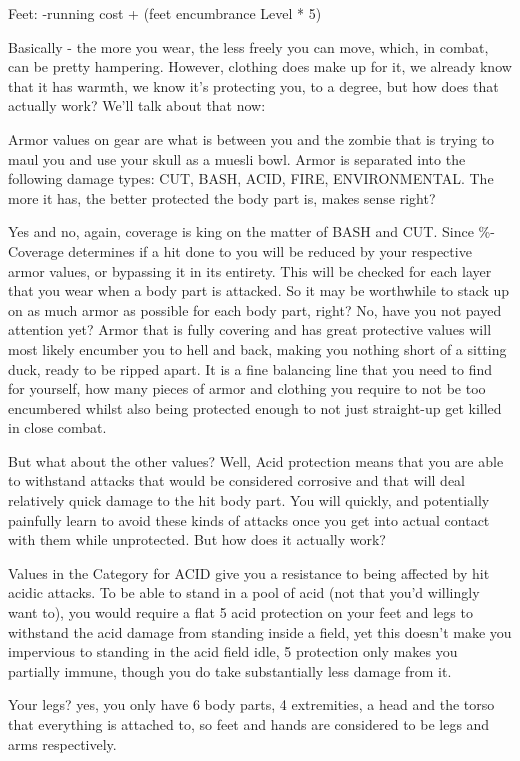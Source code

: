\documentclass[11pt]{report}
\begin{document}
Feet:
-running cost + (feet encumbrance Level * 5)

Basically - the more you wear, the less freely you can move, which, in combat, can be pretty hampering. However, clothing does make up for it, we already know that it has warmth, we know it's protecting you, to a degree, but how does that actually work? We'll talk about that now:

Armor values on gear are what is between you and the zombie that is trying to maul you and use your skull as a muesli bowl. Armor is separated into the following damage types: CUT, BASH, ACID, FIRE, ENVIRONMENTAL. The more it has, the better protected the body part is, makes sense right?

Yes and no, again, coverage is king on the matter of BASH and CUT. Since \%-Coverage determines if a hit done to you will be reduced by your respective armor values, or bypassing it in its entirety. This will be checked for each layer that you wear when a body part is attacked. So it may be worthwhile to stack up on as much armor as possible for each body part, right? No, have you not payed attention yet? Armor that is fully covering and has great protective values will most likely encumber you to hell and back, making you nothing short of a sitting duck, ready to be ripped apart. It is a fine balancing line that you need to find for yourself, how many pieces of armor and clothing you require to not be too encumbered whilst also being protected enough to not just straight-up get killed in close combat.

But what about the other values? Well, Acid protection means that you are able to withstand attacks that would be considered corrosive and that will deal relatively quick damage to the hit body part. You will quickly, and potentially painfully learn to avoid these kinds of attacks once you get into actual contact with them while unprotected. But how does it actually work?

Values in the Category for ACID give you a resistance to being affected by hit acidic attacks. To be able to stand in a pool of acid (not that you'd willingly want to), you would require a flat 5 acid protection on your feet and legs to withstand the acid damage from standing inside a field, yet this doesn't make you impervious to standing in the acid field idle, 5 protection only makes you partially immune, though you do take substantially less damage from it.

Your legs? yes, you only have 6 body parts, 4 extremities, a head and the torso that everything is attached to, so feet and hands are considered to be legs and arms respectively.
\end{document}

